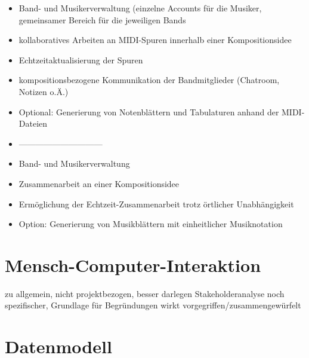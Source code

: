 \documentclass[12pt]{scrartcl}
\begin{document}
\begin{itemize}
\item Band- und Musikerverwaltung (einzelne Accounts für die Musiker, gemeinsamer Bereich für die jeweiligen Bands
\item kollaboratives Arbeiten an MIDI-Spuren innerhalb einer Kompositionsidee
\item Echtzeitaktualisierung der Spuren
\item kompositionsbezogene Kommunikation der Bandmitglieder (Chatroom, Notizen o.Ä.)
\item Optional: Generierung von Notenblättern und Tabulaturen anhand der MIDI-Dateien
\item ------------------------------
\item Band- und Musikerverwaltung
\item Zusammenarbeit an einer Kompositionsidee 
\item Ermöglichung der Echtzeit-Zusammenarbeit trotz örtlicher Unabhängigkeit
\item Option: Generierung von Musikblättern mit einheitlicher Musiknotation
\end{itemize}









\section{Mensch-Computer-Interaktion}

zu allgemein, nicht projektbezogen, besser darlegen
Stakeholderanalyse noch spezifischer, Grundlage für Begründungen
wirkt vorgegriffen/zusammengewürfelt


\section{Datenmodell}





\end{document}
